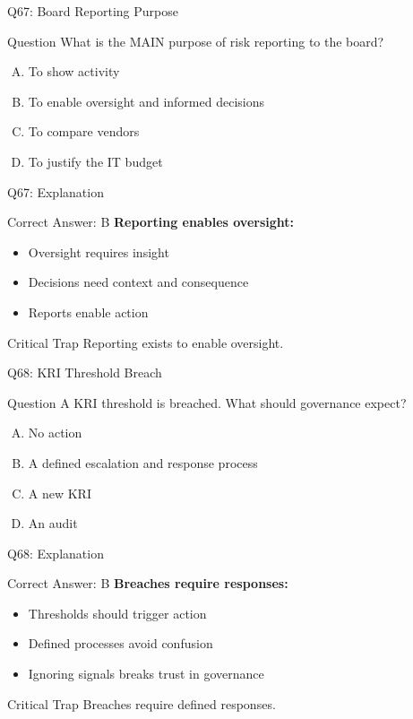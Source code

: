 \documentclass{beamer}
\begin{document}
	\begin{frame}{Q67: Board Reporting Purpose}
		\begin{block}{Question}
			What is the MAIN purpose of risk reporting to the board?
		\end{block}
		\begin{enumerate}[(A)]
			\item To show activity
			\item To enable oversight and informed decisions
			\item To compare vendors
			\item To justify the IT budget
		\end{enumerate}
	\end{frame}
	
	\begin{frame}{Q67: Explanation}
		\begin{block}{Correct Answer: B}
			\textbf{Reporting enables oversight:}
			\begin{itemize}
				\item Oversight requires insight
				\item Decisions need context and consequence
				\item Reports enable action
			\end{itemize}
		\end{block}
		\begin{alertblock}{Critical Trap}
			Reporting exists to enable oversight.
		\end{alertblock}
	\end{frame}
	
	\begin{frame}{Q68: KRI Threshold Breach}
		\begin{block}{Question}
			A KRI threshold is breached. What should governance expect?
		\end{block}
		\begin{enumerate}[(A)]
			\item No action
			\item A defined escalation and response process
			\item A new KRI
			\item An audit
		\end{enumerate}
	\end{frame}
	
	\begin{frame}{Q68: Explanation}
		\begin{block}{Correct Answer: B}
			\textbf{Breaches require responses:}
			\begin{itemize}
				\item Thresholds should trigger action
				\item Defined processes avoid confusion
				\item Ignoring signals breaks trust in governance
			\end{itemize}
		\end{block}
		\begin{alertblock}{Critical Trap}
			Breaches require defined responses.
		\end{alertblock}
	\end{frame}
	
\end{document}
